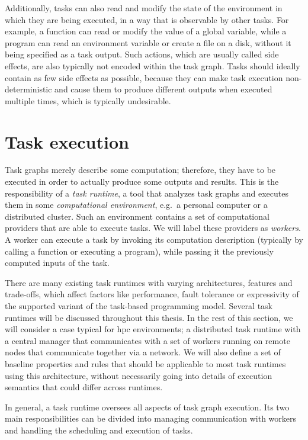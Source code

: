 Additionally, tasks can also read and modify the state of the environment in which they are being
executed, in a way that is observable by other tasks. For example, a function can read or modify
the value of a global variable, while a program can read an environment variable or create a file
on a disk, without it being specified as a task output. Such actions, which are usually called side
effects, are also typically not encoded within the task graph. Tasks should ideally contain as few
side effects as possible, because they can make task execution non-deterministic and cause them to
produce different outputs when executed multiple times, which is typically undesirable.

\section{Task execution}
\label{sec:task-graph-execution}
Task graphs merely describe some computation; therefore, they have to be executed in order to
actually produce some outputs and results. This is the responsibility of a \emph{task runtime},
a tool that analyzes task graphs and executes them in some \emph{computational environment}, e.g.\ a
personal computer or a distributed cluster. Such an environment contains a set of computational
providers that are able to execute tasks. We will label these providers as \emph{workers}.
A worker can execute a task by invoking its computation description (typically by calling a
function or executing a program), while passing it the previously computed inputs of the task.

There are many existing task runtimes with varying architectures, features and trade-offs, which
affect factors like performance, fault tolerance or expressivity of the supported variant of the
task-based programming model. Several task runtimes will be discussed throughout this thesis. In
the rest of this section, we will consider a case typical for \gls{hpc} environments;
a distributed task runtime with a central manager that communicates with a set of workers running
on remote nodes that communicate together via a network. We will also define a set of baseline
properties and rules that should be applicable to most task runtimes using this architecture,
without necessarily going into details of execution semantics that could differ across runtimes.

In general, a task runtime oversees all aspects of task graph execution. Its two main
responsibilities can be divided into managing communication with workers and handling the
scheduling and execution of tasks.

